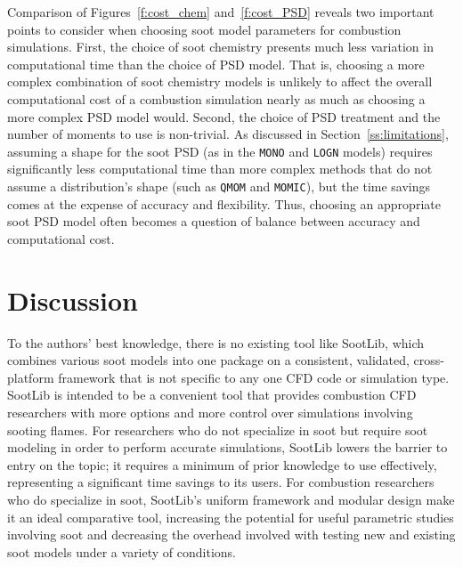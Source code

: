 \documentclass[preprint,letterpaper]{elsarticle}
\begin{document}
Comparison of Figures~\ref{f:cost_chem} and~\ref{f:cost_PSD} reveals two important points to consider when choosing soot model parameters for combustion simulations. First, the choice of soot chemistry presents much less variation in computational time than the choice of PSD model. That is, choosing a more complex combination of soot chemistry models is unlikely to affect the overall computational cost of a combustion simulation nearly as much as choosing a more complex PSD model would. Second, the choice of PSD treatment and the number of moments to use is non-trivial. As discussed in Section~\ref{ss:limitations}, assuming a shape for the soot PSD (as in the \texttt{MONO} and \texttt{LOGN} models) requires significantly less computational time than more complex methods that do not assume a distribution's shape (such as \texttt{QMOM} and \texttt{MOMIC}), but the time savings comes at the expense of accuracy and flexibility. Thus, choosing an appropriate soot PSD model often becomes a question of balance between accuracy and computational cost.


\section{Discussion}
\label{s:discussion}

%
%
%
%

To the authors' best knowledge, there is no existing tool like SootLib, which combines various soot models into one package on a consistent, validated, cross-platform framework that is not specific to any one CFD code or simulation type. SootLib is intended to be a convenient tool that provides combustion CFD researchers with more options and more control over simulations involving sooting flames. For researchers who do not specialize in soot but require soot modeling in order to perform accurate simulations, SootLib lowers the barrier to entry on the topic; it requires a minimum of prior knowledge to use effectively, representing a significant time savings to its users. For combustion researchers who do specialize in soot, SootLib's uniform framework and modular design make it an ideal comparative tool, increasing the potential for useful parametric studies involving soot and decreasing the overhead involved with testing new and existing soot models under a variety of conditions.
\end{document}
